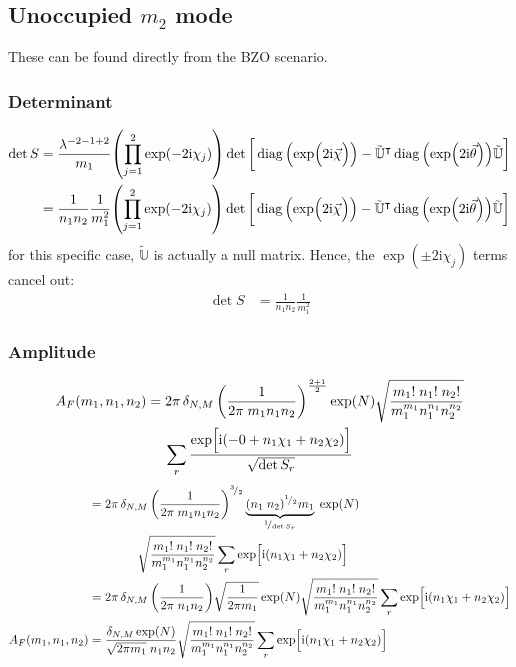 \documentclass[
	english,
	a4paper,
	fontsize=10pt,
	parskip=half,
	titlepage=true,
	DIV=12,
	final
]{scrreprt}
\newcommand*{\smallfrac}  [2]{\ensuremath{{}^        {#1} \!/_        {#2}}}
\newcommand*{\transp}{\ensuremath{^\intercal}}
\newcommand*{\iunit}{\ensuremath{\mathrm{i}}}
\DeclareMathOperator{\diag}{diag}
\begin{document}
\subsection{Unoccupied $m_2$ mode}
These can be found directly from the BZO scenario.

\subsubsection{Determinant}
\begin{align}
	\det S
&=
	\frac{ \lambda^{-2 - 1 + 2} }{ m_1 }
	\qty( \prod_{j=1}^{2} \exp(-2\iunit \chi_j) )
	\det\qty[\bigg.
		\diag\qty(\exp(\Big.2\iunit\vec{\chi}))
		-
		\tilde{\mathbb{U}}\transp
		\diag\qty(\exp(2\iunit\vec{\theta}))
		\tilde{\mathbb{U}}
	] \\
&=
	\frac{1}{n_1 n_2}
	\frac{1}{m_1^{2}}
	\qty( \prod_{j=1}^{2} \exp(-2\iunit \chi_j) )
	\det\qty[\bigg.
		\diag\qty(\exp(\Big.2\iunit\vec{\chi}))
		-
		\tilde{\mathbb{U}}\transp
		\diag\qty(\exp(2\iunit\vec{\theta}))
		\tilde{\mathbb{U}}
	]
\end{align}
for this specific case, $\tilde{\mathbb{U}}$ is actually a null matrix. Hence, the 
$\exp(\pm 2\iunit \chi_j)$ terms cancel out:
\begin{align}
	\det S
&=
	\frac{1}{n_1 n_2}
	\frac{1}{m_1^{2}}
\end{align}

\subsubsection{Amplitude}
\begin{multline}
	A_F(m_1, n_1, n_2)
=
	2\pi \, \delta_{N,M} \, \qty(
		\frac{1}{2\pi \; m_1 n_1 n_2}
	)^{\frac{2 +1}{2}}
	\exp(N)
	\sqrt{\frac
		{ m_1! \; n_1! \; n_2! }
		{ m_1^{m_1} n_1^{n_1} n_2^{n_2} }
	}
\\
	\sum_r
		\frac
		{\exp[ \Big.
			\iunit \qty( -0 + 
			n_1 \chi_1 + n_2 \chi_2)
		]}
		{\sqrt{\det S_r}}
\end{multline}
\begin{align}
\nonumber
&=
	2\pi \, \delta_{N,M} \, \qty(
		\frac{1}{2\pi \; m_1 n_1 n_2}
	)^{\smallfrac{3}{2}}
	\underbrace{
		(n_1 \; n_2)^{\smallfrac{1}{2}} m_1
	}_{\smallfrac{1}{\det S_r}} \;
	\exp(N)
	\\ & \qquad\qquad
	\sqrt{\frac
		{ m_1! \; n_1! \; n_2! }
		{ m_1^{m_1} n_1^{n_1} n_2^{n_2} }
	}
	\sum_r
		\exp[ \Big.
			\iunit \qty(  
			n_1 \chi_1 + n_2 \chi_2)
		]
	\\
&=
	2\pi \, \delta_{N,M} \, \qty(
		\frac{1}{2\pi \; n_1 n_2}
	)
	\sqrt{\frac{1}{2\pi m_1}}
	\exp(N)
	\sqrt{\frac
		{ m_1! \; n_1! \; n_2! }
		{ m_1^{m_1} n_1^{n_1} n_2^{n_2} }
	}
	\sum_r
		\exp[ \Big.
			\iunit \qty(  
			n_1 \chi_1 + n_2 \chi_2)
		]
\\
	A_F(m_1, n_1, n_2)
&=
	\frac
		{ \delta_{N,M} \exp(N) }
		{ \sqrt{2\pi m_1} \; n_1 n_2 }
	\sqrt{\frac
		{ m_1! \; n_1! \; n_2! }
		{ m_1^{m_1} n_1^{n_1} n_2^{n_2} }
	}
	\sum_r
		\exp[ \Big.
			\iunit \qty(  
			n_1 \chi_1 + n_2 \chi_2)
		]
\end{align}
\end{document}
